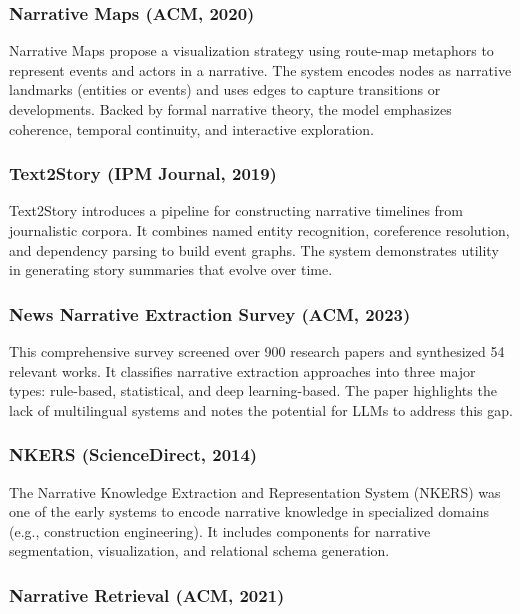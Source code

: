 \documentclass[12pt]{article}
\begin{document}
\subsubsection{Narrative Maps (ACM, 2020)}

Narrative Maps propose a visualization strategy using route-map metaphors to represent events and actors in a narrative. The system encodes nodes as narrative landmarks (entities or events) and uses edges to capture transitions or developments. Backed by formal narrative theory, the model emphasizes coherence, temporal continuity, and interactive exploration.

\subsubsection{Text2Story (IPM Journal, 2019)}

Text2Story introduces a pipeline for constructing narrative timelines from journalistic corpora. It combines named entity recognition, coreference resolution, and dependency parsing to build event graphs. The system demonstrates utility in generating story summaries that evolve over time.

\subsubsection{News Narrative Extraction Survey (ACM, 2023)}

This comprehensive survey screened over 900 research papers and synthesized 54 relevant works. It classifies narrative extraction approaches into three major types: rule-based, statistical, and deep learning-based. The paper highlights the lack of multilingual systems and notes the potential for LLMs to address this gap.

\subsubsection{NKERS (ScienceDirect, 2014)}

The Narrative Knowledge Extraction and Representation System (NKERS) was one of the early systems to encode narrative knowledge in specialized domains (e.g., construction engineering). It includes components for narrative segmentation, visualization, and relational schema generation.

\subsubsection{Narrative Retrieval (ACM, 2021)}
\end{document}

